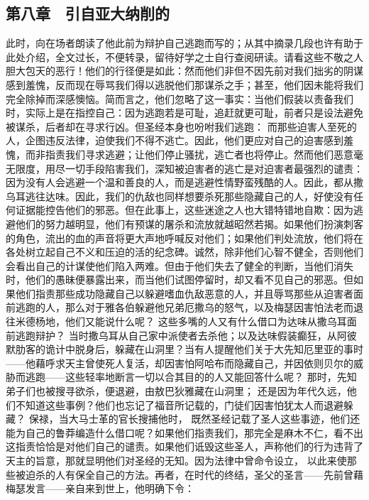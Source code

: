 
\subsection{第八章　引自亚大纳削的}

此时，向在场者朗读了他此前为辩护自己逃跑而写的；从其中摘录几段也许有助于此处介绍，全文过长，不便转录，留待好学之士自行查阅研读。请看这些不敬之人胆大包天的恶行！他们的行径便是如此：然而他们非但不因先前对我们拙劣的阴谋感到羞愧，反而现在辱骂我们得以逃脱他们那谋杀之手；甚至，他们因未能将我们完全除掉而深感懊恼。简而言之，他们忽略了这一事实：当他们假装以责备我们时，实际上是在指控自己：因为逃跑若是可耻，追赶就更可耻，前者只是设法避免被谋杀，后者却在寻求行凶。但圣经本身也吩咐我们逃跑： 而那些迫害人至死的人，企图违反法律，迫使我们不得不逃亡。因此，他们更应对自己的迫害感到羞愧，而非指责我们寻求逃避；让他们停止骚扰，逃亡者也将停止。然而他们恶意毫无限度，用尽一切手段陷害我们，深知被迫害者的逃亡是对迫害者最强烈的谴责：因为没有人会逃避一个温和善良的人，而是逃避性情野蛮残酷的人。因此，都从撒乌耳逃往达味。因此，我们的仇敌也同样想要杀死那些隐藏自己的人，好使没有任何证据能控告他们的邪恶。但在此事上，这些迷途之人也大错特错地自欺：因为逃避他们的努力越明显，他们有预谋的屠杀和流放就越昭然若揭。如果他们扮演刺客的角色，流出的血的声音将更大声地呼喊反对他们；如果他们判处流放，他们将在各处树立起自己不义和压迫的活的纪念碑。诚然，除非他们心智不健全，否则他们会看出自己的计谋使他们陷入两难。但由于他们失去了健全的判断，当他们消失时，他们的愚昧便暴露出来，而当他们试图停留时，却又看不见自己的邪恶。但如果他们指责那些成功隐藏自己以躲避嗜血仇敌恶意的人，并且辱骂那些从迫害者面前逃跑的人，那么对于雅各伯躲避他兄弟厄撒乌的怒气，以及梅瑟因害怕法老而退往米德杨地，他们又能说什么呢？ 这些多嘴的人又有什么借口为达味从撒乌耳面前逃跑辩护？ 当时撒乌耳从自己家中派使者去杀他；以及达味假装癫狂，从阿彼默肋客的诡计中脱身后，躲藏在山洞里？当有人提醒他们关于大先知厄里亚的事时——他藉呼求天主曾使死人复活，却因害怕阿哈布而隐藏自己，并因依则贝尔的威胁而逃跑——这些轻率地断言一切以合其目的的人又能回答什么呢？ 那时，先知弟子们也被搜寻欲杀，便退避，由敖巴狄雅藏在山洞里； 还是因为年代久远，他们不知道这些事例？他们也忘记了福音所记载的，门徒们因害怕犹太人而退避躲藏？ 保禄，当大马士革的官长搜捕他时， 既然圣经记载了圣人这些事迹，他们还能为自己的鲁莽编造什么借口呢？如果他们指责我们，那完全是麻木不仁，看不出这指责恰恰是对他们自己的谴责。如果他们诋毁这些圣人，声称他们的行为违背了天主的旨意，那就显明他们对圣经的无知。因为法律中曾命令设立， 以此来使那些被迫杀的人有保全自己的方法。再者，在时代的终结，圣父的圣言——先前曾藉梅瑟发言——亲自来到世上，他明确下令： 